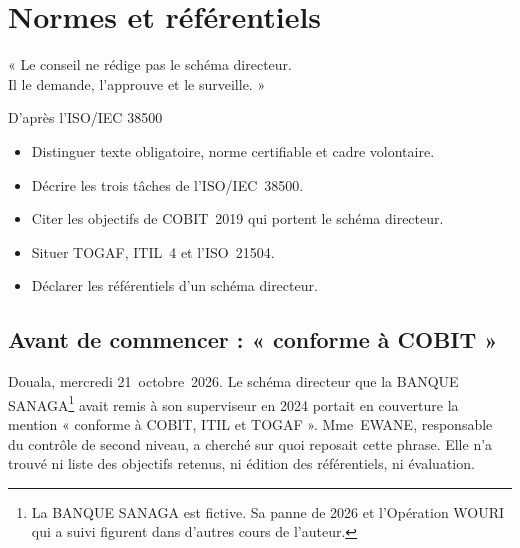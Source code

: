 
\chapter{Normes et référentiels}
\label{chap:normes}

\epigraph{%
    « Le conseil ne rédige pas le schéma directeur.\\
    Il le demande, l'approuve et le surveille. »%
}{D'après l'ISO/IEC 38500}


\begin{boxobjectifs}
\begin{itemize}
    \item Distinguer texte obligatoire, norme certifiable et cadre volontaire.
    \item Décrire les trois tâches de l'ISO/IEC~38500.
    \item Citer les objectifs de COBIT~2019 qui portent le schéma directeur.
    \item Situer TOGAF, ITIL~4 et l'ISO~21504.
    \item Déclarer les référentiels d'un schéma directeur.
\end{itemize}
\end{boxobjectifs}

\bigskip

\section*{Avant de commencer : « conforme à COBIT »}

Douala, mercredi 21~octobre~2026. Le schéma directeur que la BANQUE SANAGA\footnote{La BANQUE SANAGA est fictive.
Sa panne de 2026 et l'Opération WOURI qui a suivi figurent dans d'autres cours de l'auteur.} avait remis à son
superviseur en 2024 portait en couverture la mention « conforme à COBIT, ITIL et TOGAF ». Mme~EWANE, responsable
du contrôle de second niveau, a cherché sur quoi reposait cette phrase. Elle n'a trouvé ni liste des objectifs
retenus, ni édition des référentiels, ni évaluation.

